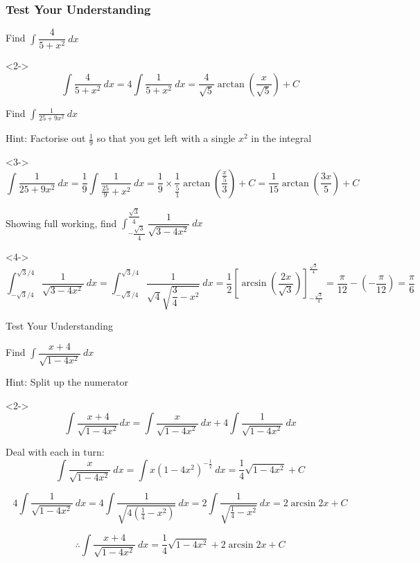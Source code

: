 \documentclass{beamer}
\begin{document}
	\begin{frame}[shrink=40]
		\frametitle{Test Your Understanding}
		\begin{problem}
			Find $\int \dfrac{4}{5+x^{2}}\ dx$
		\end{problem}
		\begin{solution}<2->
			\[ \int \frac{4}{5+x^{2}}\ dx = 4 \int \frac{1}{5+x^{2}}\ dx=\frac{4}{\sqrt{5}}\arctan \left( \frac{x}{\sqrt{5}}\right) +C \]
		\end{solution}
		
		\begin{problem}
			Find $\int \frac{1}{25+9x^{2}}\ dx$
		\end{problem}
		\alert{Hint: Factorise out $\frac{1}{9}$ so that you get left with a single $x^{2}$ in the integral}
		\begin{solution}<3->
			\[\int \frac{1}{25+9x^{2}}\ dx=\frac{1}{9}\int \frac{1}{\frac{25}{9}+x^{2}}\ dx=\frac{1}{9}\times \frac{1}{\frac{5}{1}}\arctan \left( \frac{\frac{x}{5}}{3}\right) +C=\frac{1}{15}\arctan \left( \frac{3x}{5}\right) +C\]
		\end{solution}
		
		\begin{problem}
			Showing full working, find $\int ^{\dfrac{\sqrt{3}}{4}}_{-\dfrac{\sqrt{3}}{4}}\dfrac{1}{\sqrt{3-4x^{2}}}\ dx$
		\end{problem}
		\begin{solution}<4->
			\[\int ^{\sqrt{3}/4}_{-\sqrt{3}/4}\dfrac{1}{\sqrt{3-4x^{2}}}\ dx=\int ^{\sqrt{3}/{4}}_{-\sqrt{3}/{4}} \dfrac{1}{\sqrt{4}\sqrt{\dfrac{3}{4}-x^{2}}}\ dx=\dfrac{1}{2}\left[ \arcsin \left( \dfrac{2x}{\sqrt{3}}\right) \right] _{-\frac{\sqrt{3}}{4}}^{\frac{\sqrt{3}}{4}}=\frac{\pi }{12}-\left( -\frac{\pi }{12}\right) =\frac{\pi }{6}\]
		\end{solution}
	\end{frame}
	
	\begin{frame}[shrink]{Test Your Understanding}
		
		\begin{problem}
			Find $\int \dfrac{x+4}{\sqrt{1-4x^{2}}}\ dx$
		\end{problem}
		\alert{Hint: Split up the numerator}
		\begin{solution}<2->
			\[\int \frac{x+4}{\sqrt{1-4x^{2}}}dx = \int \frac{x}{\sqrt{1-4x^{2}}}\ dx+4\int \frac{1}{\sqrt{1-4x^{2}}}\ dx \]
			
			Deal with each in turn:
			\[ \int \frac{x}{\sqrt{1-4x^{2}}}\ dx = \int x\left( 1-4x^{2}\right) ^{-\frac{1}{2}}\ dx=\frac{1}{4}\sqrt{1-4x^{2}}+C \]
			
			\[ 4\int \frac{1}{\sqrt{1-4x^{2}}}\ dx = 4\int \frac{1}{\sqrt{ 4( \frac{1}{4}-x^{2}) }}\ dx=2\int \frac{1}{\sqrt{\frac{1}{4}-x^{2}}}\ dx=2\arcsin 2x+C \]
			
			\[ \therefore \int \frac{x+4}{\sqrt{1-4x^{2}}}\ dx = \frac{1}{4}\sqrt{1-4x^{2}}+2\arcsin 2x+C\]
		\end{solution}
		
	\end{frame}
	
\end{document}
